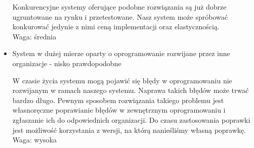 \documentclass[../wstep.tex]{subfiles}
\begin{document}
\begin{itemize}
          Konkurencyjne systemy oferujące podobne rozwiązania są już dobrze ugruntowane na rynku i przetestowane. Nasz system może spróbować konkurować jedynie z nimi ceną implementacji oraz elastycznością.\\
          Waga: średnia
    \item System w dużej mierze oparty o oprogramowanie rozwijane przez inne organizacje - nisko prawdopodobne

          W czasie życia systemu mogą pojawić się błędy w oprogramowaniu nie rozwijanym w ramach naszego systemu. Naprawa takich błędów może trwać bardzo długo. Pewnym sposobem rozwiązania takiego problemu jest własnoręczne poprawianie błędów w zewnętrznym oprogramowaniu i zgłaszanie ich do odpowiednich organizacji. Do czasu zastosowania poprawki jest możliwość korzystania z wersji, na którą nanieśliśmy własną poprawkę.\\
          Waga: wysoka

\end{itemize}
\end{document}
